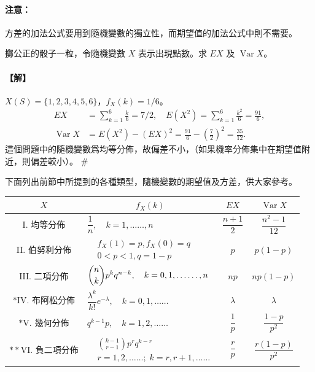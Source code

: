 \medskip
\paragraph{注意：}
方差的加法公式要用到隨機變數的獨立性，而期望值的加法公式中則不需要。

\medskip
\begin{example}\label{ex:b5-5-14}
擲公正的骰子一粒，令隨機變數 $X$ 表示出現點數。求 $EX$ 及 $\operatorname{Var} X$。
\end{example}
\paragraph{【解】}
$X(S)=\{1, 2, 3, 4, 5, 6\}$，$f_X(k)=1/6$。
\begin{align*}
EX &= \sum_{k=1}^6 \frac{k}{6} = 7/2, \quad E(X^2) = \sum_{k=1}^6 \frac{k^2}{6} = \frac{91}{6}, \\
\operatorname{Var} X &= E(X^2) - (EX)^2 = \frac{91}{6} - \left(\frac{7}{2}\right)^2 = \frac{35}{12}.
\end{align*}
這個問題中的隨機變數爲均等分佈，故偏差不小，（如果機率分佈集中在期望值附近，則偏差較小）。 \hfill \#

\medskip
下面列出前節中所提到的各種類型，隨機變數的期望值及方差，供大家參考。

\begin{center}
\renewcommand{\arraystretch}{1.5}
\begin{tabular}{|c|l|c|c|}
\hline
$X$ & \multicolumn{1}{c|}{$f_X(k)$} & $EX$ & $\operatorname{Var} X$ \\
\hline
I. 均等分佈 & $\dfrac{1}{n}, \quad k = 1, \ldots\ldots, n$ & $\dfrac{n+1}{2}$ & $\dfrac{n^2-1}{12}$ \\
\hline
II. 伯努利分佈 & $\begin{aligned}&f_X(1)=p, f_X(0)=q \\ &0 < p < 1, q = 1-p\end{aligned}$ & $p$ & $p(1-p)$ \\
\hline
III. 二項分佈 & $\dbinom{n}{k} p^k q^{n-k}, \quad k = 0, 1, \ldots\ldots, n$ & $np$ & $np(1-p)$ \\
\hline
$*$IV. 布阿松分佈 & $\dfrac{\lambda^k}{k!} e^{-\lambda}, \quad k = 0, 1, \ldots\ldots$ & $\lambda$ & $\lambda$ \\
\hline
$*$V. 幾何分佈 & $q^{k-1}p, \quad k = 1, 2, \ldots\ldots$ & $\dfrac{1}{p}$ & $\dfrac{1-p}{p^2}$ \\
\hline
$**$VI. 負二項分佈 & $\begin{aligned}&\binom{k-1}{r-1} p^r q^{k-r} \\ &r=1, 2, \ldots\ldots; \; k=r, r+1, \ldots\ldots\end{aligned}$ & $\dfrac{r}{p}$ & $\dfrac{r(1-p)}{p^2}$ \\
\hline
\end{tabular}
\end{center}

